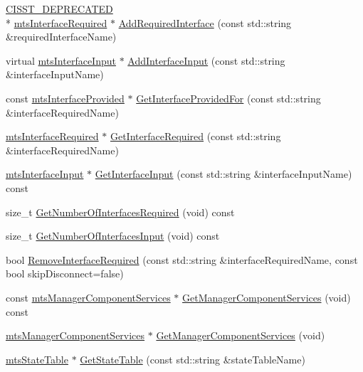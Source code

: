 \begin{DoxyCompactItemize}
\item 
\hyperlink{cmn_portability_8h_a63da7164735f9501be651b1f2bbc0121}{C\-I\-S\-S\-T\-\_\-\-D\-E\-P\-R\-E\-C\-A\-T\-E\-D} \\*
\hyperlink{classmts_interface_required}{mts\-Interface\-Required} $\ast$ \hyperlink{classmts_component_aa0e3e69d339ddc9f13e39976289b9e0d}{Add\-Required\-Interface} (const std\-::string \&required\-Interface\-Name)
\item 
virtual \hyperlink{classmts_interface_input}{mts\-Interface\-Input} $\ast$ \hyperlink{classmts_component_aa40d8f242fd9f3fe63085bce252affdb}{Add\-Interface\-Input} (const std\-::string \&interface\-Input\-Name)
\item 
const \hyperlink{classmts_interface_provided}{mts\-Interface\-Provided} $\ast$ \hyperlink{classmts_component_a96d97e272bdabf8bbfa3b810a16de379}{Get\-Interface\-Provided\-For} (const std\-::string \&interface\-Required\-Name)
\item 
\hyperlink{classmts_interface_required}{mts\-Interface\-Required} $\ast$ \hyperlink{classmts_component_a2274eb292eda7c34f006e92f92bb77cd}{Get\-Interface\-Required} (const std\-::string \&interface\-Required\-Name)
\item 
\hyperlink{classmts_interface_input}{mts\-Interface\-Input} $\ast$ \hyperlink{classmts_component_adeb03b916eb080ef76d6768903ee7235}{Get\-Interface\-Input} (const std\-::string \&interface\-Input\-Name) const 
\item 
size\-\_\-t \hyperlink{classmts_component_a1e4a567e217c8c36c3f4d76a6dcd64e7}{Get\-Number\-Of\-Interfaces\-Required} (void) const 
\item 
size\-\_\-t \hyperlink{classmts_component_a26deb2a36442f836c8496afca838f878}{Get\-Number\-Of\-Interfaces\-Input} (void) const 
\item 
bool \hyperlink{classmts_component_a8099dc203565dce696c79f68b27a46bc}{Remove\-Interface\-Required} (const std\-::string \&interface\-Required\-Name, const bool skip\-Disconnect=false)
\item 
const \hyperlink{classmts_manager_component_services}{mts\-Manager\-Component\-Services} $\ast$ \hyperlink{classmts_component_a1442cdcee69c626d697cfa8346575e4d}{Get\-Manager\-Component\-Services} (void) const 
\item 
\hyperlink{classmts_manager_component_services}{mts\-Manager\-Component\-Services} $\ast$ \hyperlink{classmts_component_a4c5eeabacb5094e96e323fc458e738b7}{Get\-Manager\-Component\-Services} (void)
\item 
\hyperlink{classmts_state_table}{mts\-State\-Table} $\ast$ \hyperlink{classmts_component_a2f16c864f392c4411f35e57fcc0ef4b7}{Get\-State\-Table} (const std\-::string \&state\-Table\-Name)

\end{DoxyCompactItemize}
